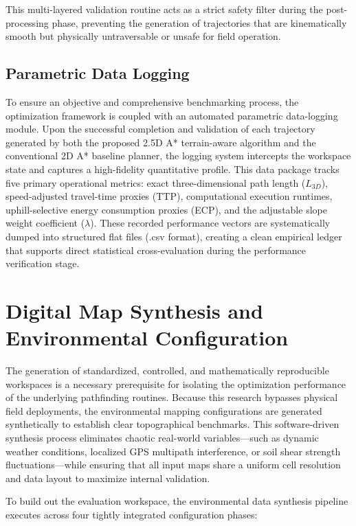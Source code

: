 This multi-layered validation routine acts as a strict safety filter during the post-processing
phase, preventing the generation of trajectories that are kinematically smooth but physically
untraversable or unsafe for field operation.

\subsection{Parametric Data Logging}

To ensure an objective and comprehensive benchmarking process, the optimization framework is coupled
with an automated parametric data-logging module. Upon the successful completion and validation of
each trajectory generated by both the proposed 2.5D A* terrain-aware algorithm and the conventional
2D A* baseline planner, the logging system intercepts the workspace state and captures a
high-fidelity quantitative profile. This data package tracks five primary operational metrics: exact
three-dimensional path length ($L_{3D}$), speed-adjusted travel-time proxies (TTP), computational
execution runtimes, uphill-selective energy consumption proxies (ECP), and the adjustable slope
weight coefficient ($\lambda$). These recorded performance vectors are systematically dumped into
structured flat files (.csv format), creating a clean empirical ledger that supports direct
statistical cross-evaluation during the performance verification stage.

\section{Digital Map Synthesis and Environmental Configuration}

The generation of standardized, controlled, and math\-e\-mat\-i\-cal\-ly re\-pro\-duc\-i\-ble
work\-spaces is a necessary pre\-req\-ui\-site for isolating the optimization performance of the
underlying pathfinding routines. Because this research bypasses physical field deployments, the
environmental mapping configurations are generated synthetically to establish clear topographical
benchmarks. This software-driven synthesis process eliminates chaotic real-world variables---such as
dynamic weather conditions, localized GPS multipath interference, or soil shear strength
fluctuations---while ensuring that all input maps share a uniform cell resolution and data layout to
maximize internal validation.

To build out the evaluation workspace, the environmental data synthesis pipeline executes across
four tightly integrated configuration phases:

